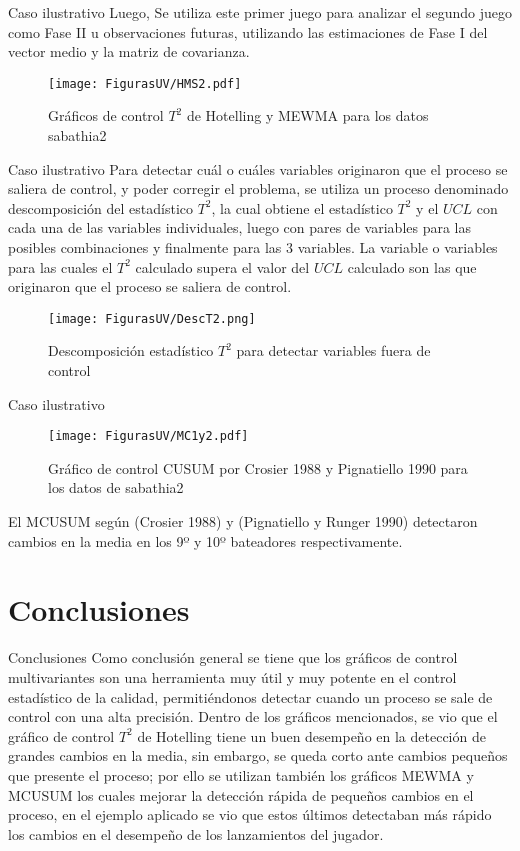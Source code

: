 \documentclass[10pt]{beamer}
\begin{document}
\begin{frame}{Caso ilustrativo}
Luego, Se utiliza este primer juego para analizar el segundo juego como Fase II u observaciones futuras, utilizando las estimaciones de Fase I del vector medio y la matriz de covarianza.
\begin{figure}[h!]
  \centering
  \texttt{[image: FigurasUV/HMS2.pdf]}
  \caption{Gráficos de control $T^2$ de Hotelling y MEWMA para los datos sabathia2}
\end{figure}
\end{frame}

\begin{frame}{Caso ilustrativo}
Para detectar cuál o cuáles variables originaron que el proceso se saliera de control, y poder corregir el problema, se utiliza un proceso denominado descomposición del estadístico $T^2$, la cual obtiene el estadístico $T^2$ y el $UCL$ con cada una de las variables individuales, luego con pares de variables para las posibles combinaciones y finalmente para las 3 variables. La variable o variables para las cuales el $T^2$ calculado supera el valor del $UCL$ calculado son las que originaron que el proceso se saliera de control. 
\begin{figure}[h!]
  \centering
  \texttt{[image: FigurasUV/DescT2.png]}
  \caption{Descomposición estadístico $T^2$ para detectar variables fuera de control}
\end{figure}
\end{frame}

\begin{frame}{Caso ilustrativo}
\begin{figure}[h!]
  \centering
  \texttt{[image: FigurasUV/MC1y2.pdf]}
  \caption{Gráfico de control CUSUM por Crosier 1988 y Pignatiello 1990 para los datos de sabathia2}
\end{figure}

El MCUSUM según (Crosier 1988) y (Pignatiello y Runger 1990) detectaron cambios en la media en los 9º y 10º bateadores respectivamente.
\end{frame}

\section{Conclusiones}
\begin{frame}{Conclusiones}
Como conclusión general se tiene que los gráficos de control multivariantes son una herramienta muy útil y muy potente en el control estadístico de la calidad, permitiéndonos detectar cuando un proceso se sale de control con una alta precisión. Dentro de los gráficos mencionados, se vio que el gráfico de control $T^2$ de Hotelling tiene un buen desempeño en la detección de grandes cambios en la media, sin embargo, se queda corto ante cambios pequeños que presente el proceso; por ello se utilizan también los gráficos MEWMA y MCUSUM los cuales mejorar la detección rápida de pequeños cambios en el proceso, en el ejemplo aplicado se vio que estos últimos detectaban más rápido los cambios en el desempeño de los lanzamientos del jugador. 
\nocite{LGCM,LGCM1}
\end{frame}




\end{document}
